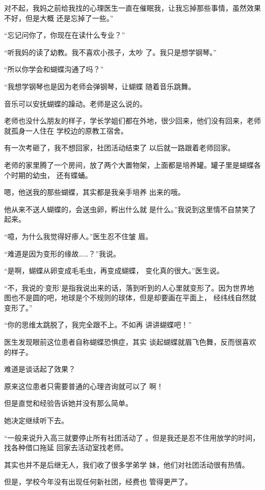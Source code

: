 \documentclass{article}
\begin{document}
对不起，我妈之前给我找的心理医生一直在催眠我，让我忘掉那些事情，虽然效果不好，但是大概
还是忘掉了一些。” 


“忘记问你了，你现在在读什么专业？” 

“听我妈的读了幼教。我不喜欢小孩子，太吵
了。我只是想学钢琴。” 


“所以你学会和蝴蝶沟通了吗？” 

“我想学钢琴也是因为老师会弹钢琴，让蝴蝶
随着音乐跳舞。 

音乐可以安抚蝴蝶的躁动。老师是这么说的。

老师也没什么朋友的样子，学长学姐们都在外地，很少回来，他们没有回来，老师就孤身一人住在
学校边的原教工宿舍。 

\newpage

有一次考砸了，我不想回家，社团活动结束了
以后就一路跟着老师回家。 

老师的家里腾了一个房间，放了两个大置物架，上面都是培养罐。罐子里是蝴蝶各个时期的幼虫，
还有蝶蛹。 

嗯，他送我的那些蝴蝶，其实都是我亲手培养
出来的哦。 

他从来不送人蝴蝶的，会送虫卵，孵出什么就
是什么。”我说到这里情不自禁笑了起来。 

“噫，为什么我觉得好瘆人。”医生忍不住皱
眉。 


“难道是因为变形的缘故……？”我说。 

“是啊，蝴蝶从卵变成毛毛虫，再变成蝴蝶，
变化真的很大。”医生说。 

\newpage

“不，我说的‘变形’是指我说出来的话，落到听到的人心里就变形了。因为世界地图也不是圆的吧，地球是个不规则的球体，但是却要画在平面上，
经纬线自然就变形了。” 

“你的思维太跳脱了，我完全跟不上。不如再
讲讲蝴蝶吧！” 

医生发现眼前这位患者自称蝴蝶恐惧症，其实
谈起蝴蝶就眉飞色舞，反而很喜欢的样子。 


难道是谈话起了效果？ 

原来这位患者只需要普通的心理咨询就可以了
啊！ 


但是直觉和经验告诉她并没有那么简单。 


她决定继续听下去。 

“一般来说升入高三就要停止所有社团活动了
\newpage
。但是我还是忍不住用放学的时间，找各种借口拖延
回家去活动室找老师。 

其实也并不是后继无人，我们收了很多学弟学
妹，他们对社团活动很有热情。 

但是，学校今年没有出现任何新社团，经费也
管得更严了。 
\end{document}
